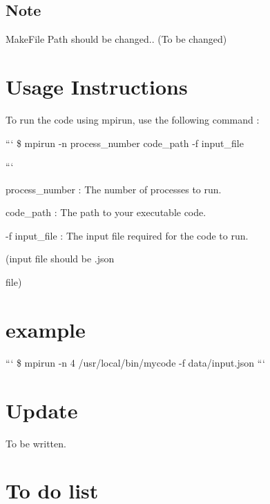 \subsection*{Note}

Make\-File Path should be changed.. (To be changed)

\section*{Usage Instructions }

To run the code using {\ttfamily mpirun}, use the following command \-:

``` \$ mpirun -\/n process\-\_\-number code\-\_\-path -\/f input\-\_\-file

```


\begin{DoxyItemize}
\item process\-\_\-number \-: The number of processes to run.
\item code\-\_\-path \-: The path to your executable code.
\item -\/f input\-\_\-file \-: The input file required for the code to run.
\begin{DoxyItemize}
\item (input file should be {\ttfamily .json}\par
 file)
\end{DoxyItemize}
\end{DoxyItemize}

\section*{example}

``` \$ mpirun -\/n 4 /usr/local/bin/mycode -\/f data/input.\-json ```

\section*{Update }

{\ttfamily To be written.}

\section*{To do list }


